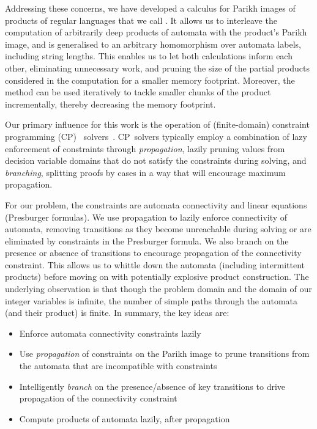Addressing these concerns, we have developed a calculus for Parikh images of
products of regular languages that we call \Calculus{}. It allows us to
interleave the computation of arbitrarily deep products of automata with the
product's Parikh image, and is generalised to an arbitrary homomorphism over
automata labels, including string lengths. This enables us to let both
calculations inform each other, eliminating unnecessary work, and pruning the
size of the partial products considered in the computation for a smaller memory
footprint. Moreover, the method can be used iteratively to tackle smaller chunks
of the product incrementally, thereby decreasing the memory footprint.

Our primary influence for this work is the operation of (finite-domain) 
constraint programming (CP)%
~solvers~\cite{cp}. CP~solvers typically employ a combination of lazy enforcement
of constraints through \emph{propagation},
lazily pruning values from decision variable domains that do not satisfy 
the constraints during solving, and \emph{branching}, splitting proofs
by cases in a way that will encourage maximum propagation.

For our problem, the constraints are automata connectivity and linear
equations (Presburger formulas).
We use propagation to lazily enforce connectivity of automata,
removing transitions as they become unreachable during solving or are
eliminated by constraints in the Presburger formula. We
also branch on the presence or absence of transitions to
encourage propagation of the connectivity constraint. This allows
us to whittle down the automata
(including intermittent products) before moving on with potentially
 explosive product construction. The underlying observation
is that though the problem domain and the domain of our integer variables
is infinite, the number of simple paths
through the automata (and their product) is finite. In summary, the key ideas are:

{
    \centering
    \begin{tcolorbox}[colback=gray!5!white,colframe=gray!75!black,%
        title=Key ideas of \Calculus{},%
        width=0.8\linewidth]

        \begin{itemize}
            \item Enforce automata connectivity constraints lazily
            \item Use \emph{propagation} of constraints on the Parikh image to prune
            transitions from the automata that are incompatible with constraints
            \item Intelligently \emph{branch} on the presence\slash{}absence of key
             transitions to drive propagation of the connectivity constraint
             \item Compute products of automata lazily, after propagation
        \end{itemize}
    \end{tcolorbox}
  }


